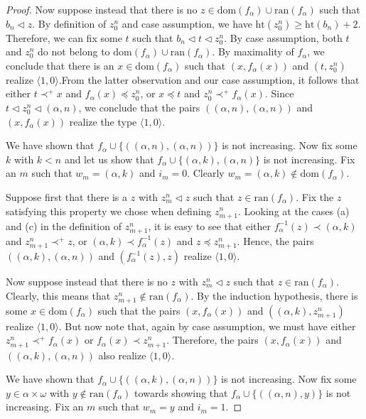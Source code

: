 \documentclass[12pt]{amsart}
\theoremstyle{definition}
\theoremstyle{remark}
\begin{document}
\begin{proof}
Now suppose instead that there is no $z \in \mathrm{dom}(f_\alpha) \cup \mathrm{ran}(f_\alpha)$ such that $b_n \lhd z$. By definition of $z_0^n$ and case assumption, we have $\mathrm{ht}(z_0^n) \ge \mathrm{ht}(b_n)+2$. Therefore, we can fix some $t$ such that $b_n \lhd t \lhd z_0^n$. By case assumption, both $t$ and $z_0^n$ do not belong to $\mathrm{dom}(f_\alpha) \cup \mathrm{ran}(f_\alpha)$. By maximality of $f_\alpha$, we conclude that there is an $x \in \mathrm{dom}(f_\alpha)$ such that $(x, f_\alpha(x))$ and $(t, z_0^n)$ realize $\langle 1,0\rangle$.From the latter observation and our case assumption, it follows that either $t \prec^+ x$ and $f_\alpha(x) \preceq z_0^n$, or $x \preceq t$ and $z_0^n \prec^+ f_\alpha(x)$.
Since $t \lhd z_0^n \lhd (\alpha, n)$, we conclude that the pairs $((\alpha, n), (\alpha, n))$ and $(x, f_\alpha(x))$ realize the type $\langle 1,0\rangle$. 

We have shown that $f_\alpha \cup \{((\alpha, n), (\alpha, n))\}$ is not increasing. Now fix some $k$ with $k < n$ and let us show that $f_\alpha \cup \{(\alpha, k), (\alpha, n)\}$ is not increasing. Fix  an $m$ such that $w_m = (\alpha, k)$ and $i_m = 0$. Clearly $w_m = (\alpha, k) \not\in \mathrm{dom}(f_\alpha)$.

Suppose first that there is a $z$ with $z_m^n \lhd z$ such that $z \in \mathrm{ran}(f_\alpha)$. Fix the $z$ satisfying this property we chose when defining $z_{m+1}^n$. Looking at the cases (a) and (c) in the definition of $z_{m+1}^n$, it is easy to see that either $f_\alpha^{-1}(z) \prec (\alpha, k)$ and $z_{m+1}^n \prec^+ z$, or $(\alpha, k) \prec f_\alpha^{-1}(z)$ and $z \preceq z_{m+1}^n$. Hence, the pairs $((\alpha, k), (\alpha, n))$ and $(f_\alpha^{-1}(z), z)$ realize $\langle 1,0\rangle$. 

Now suppose instead that there is no $z$ with $z_m^n \lhd z$ such that $z \in \mathrm{ran}(f_\alpha)$. Clearly, this means that $z_{m+1}^n \not\in \mathrm{ran}(f_\alpha)$. By the induction hypothesis, there is some $x \in \mathrm{dom}(f_\alpha)$ such that the pairs $(x, f_\alpha(x))$ and $((\alpha, k), z_{m+1}^n)$ realize $\langle 1,0\rangle$. But now note that, again by case assumption, we must have either $z_{m+1}^n \prec^+ f_\alpha(x)$ or $f_\alpha(x) \prec z_{m+1}^n$. Therefore, the pairs $(x, f_\alpha(x))$ and $((\alpha, k), (\alpha, n))$ also realize $\langle 1,0\rangle$.

We have shown that $f_\alpha \cup \{((\alpha, k), (\alpha, n))\}$ is not increasing. Now fix some $y \in \alpha \times \omega$ with $y \not\in \mathrm{ran}(f_\alpha)$ towards showing that $f_\alpha \cup \{((\alpha, n), y)\}$ is not increasing. Fix an $m$ such that $w_m = y$ and $i_m = 1$. 


\end{proof}
\end{document}
